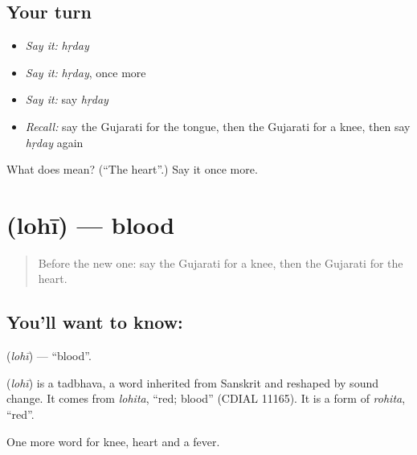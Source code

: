 \subsection*{Your turn}
\begin{itemize}
\raggedright
  \item \emph{Say it:} \emph{hṛday}
  \item \emph{Say it:} \emph{hṛday}, once more
  \item \emph{Say it:} say \emph{hṛday}
  \item \emph{Recall:} say the Gujarati for the tongue, then the Gujarati for a knee, then say \emph{hṛday} again
\end{itemize}

\begin{tcolorbox}[breakable,colback=teal!4,colframe=teal!35!black,title={Before you move on}]
What does  mean? (\textquotedblleft{}The heart\textquotedblright{}.) Say it once more.
\end{tcolorbox}
\section[\texorpdfstring{\gu{લોહી} (lohī)}{લોહી (lohī)}]{ (lohī) — blood}

\label{lesson:GU-C48-blood}



\begin{quote}
Before the new one: say the Gujarati for a knee, then the Gujarati for the heart.
\end{quote}

\subsection*{You'll want to know: }
\textbf{} (\emph{lohī}) — \textquotedblleft{}blood\textquotedblright{}.

\begin{cousinweb}
\textbf{} (\emph{lohī}) is a tadbhava, a word inherited from Sanskrit and reshaped by sound change. It comes from \emph{lohita}, \textquotedblleft{}red; blood\textquotedblright{} (CDIAL 11165). It is a form of \emph{rohita}, \textquotedblleft{}red\textquotedblright{}.
\end{cousinweb}

\begin{grammarlens}[title={What you've built}]
One more word for knee, heart and a fever.
\end{grammarlens}

